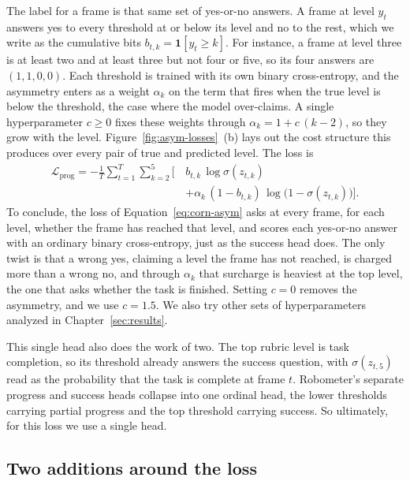 The label for a frame is that same set of yes-or-no answers. A frame at level $y_t$ answers yes to every threshold at or below its level and no to the rest, which we write as the cumulative bits $b_{t,k} = \mathbf{1}[y_t \ge k]$. For instance, a frame at level three is at least two and at least three but not four or five, so its four answers are $(1,1,0,0)$. Each threshold is trained with its own binary cross-entropy, and the asymmetry enters as a weight $\alpha_k$ on the term that fires when the true level is below the threshold, the case where the model over-claims. A single hyperparameter $c \ge 0$ fixes these weights through $\alpha_k = 1 + c\,(k-2)$, so they grow with the level. Figure~\ref{fig:asym-losses}~(b) lays out the cost structure this produces over every pair of true and predicted level. The loss is
\begin{equation}
\begin{split}
\mathcal{L}_{\mathrm{prog}} = -\frac{1}{T}\sum_{t=1}^{T} \sum_{k=2}^{5} \Big[\, & b_{t,k}\,\log\sigma(z_{t,k}) \\
&+ \alpha_k\,(1 - b_{t,k})\,\log\big(1 - \sigma(z_{t,k})\big) \Big].
\end{split}
\label{eq:corn-asym}
\end{equation}
To conclude, the loss of Equation~\ref{eq:corn-asym} asks at every frame, for each level, whether the frame has reached that level, and scores each yes-or-no answer with an ordinary binary cross-entropy, just as the success head does. The only twist is that a wrong yes, claiming a level the frame has not reached, is charged more than a wrong no, and through $\alpha_k$ that surcharge is heaviest at the top level, the one that asks whether the task is finished. Setting $c = 0$ removes the asymmetry, and we use $c = 1.5$. We also try other sets of hyperparameters analyzed in Chapter~\ref{sec:results}.

This single head also does the work of two. The top rubric level is task completion, so its threshold already answers the success question, with $\sigma(z_{t,5})$ read as the probability that the task is complete at frame $t$. Robometer's separate progress and success heads collapse into one ordinal head, the lower thresholds carrying partial progress and the top threshold carrying success. So ultimately, for this loss we use a single head.

\subsection{Two additions around the loss}
\label{sec:method-extras}

